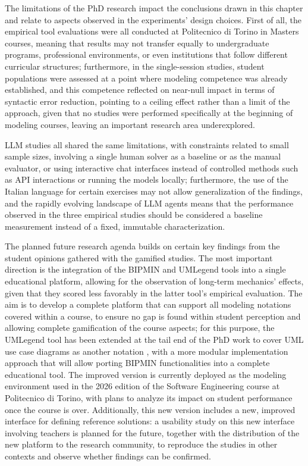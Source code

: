 The limitations of the PhD research impact the conclusions drawn in this chapter and relate to aspects observed in the experiments' design choices. First of all, the empirical tool evaluations were all conducted at Politecnico di Torino in Masters courses, meaning that results may not transfer equally to undergraduate programs, professional environments, or even institutions that follow different curricular structures; furthermore, in the single-session studies, student populations were assessed at a point where modeling competence was already established, and this competence reflected on near-null impact in terms of syntactic error reduction, pointing to a ceiling effect rather than a limit of the approach, given that no studies were performed specifically at the beginning of modeling courses, leaving an important research area underexplored. 

LLM studies all shared the same limitations, with constraints related to small sample sizes, involving a single human solver as a baseline or as the manual evaluator, or using interactive chat interfaces instead of controlled methods such as API interactions or running the models locally; furthermore, the use of the Italian language for certain exercises may not allow generalization of the findings, and the rapidly evolving landscape of LLM agents means that the performance observed in the three empirical studies should be considered a baseline measurement instead of a fixed, immutable characterization.

The planned future research agenda builds on certain key findings from the student opinions gathered with the gamified studies. The most important direction is the integration of the BIPMIN and UMLegend tools into a single educational platform, allowing for the observation of long-term mechanics' effects, given that they scored less favorably in the latter tool's empirical evaluation. The aim is to develop a complete platform that can support all modeling notations covered within a course, to ensure no gap is found within student perception and allowing complete gamification of the course aspects; for this purpose, the UMLegend tool has been extended at the tail end of the PhD work to cover UML use case diagrams as another notation \cite{garaccione2026enhancinggamifiedtooluml}, with a more modular implementation approach that will allow porting BIPMIN functionalities into a complete educational tool. The improved version is currently deployed as the modeling environment used in the 2026 edition of the Software Engineering course at Politecnico di Torino, with plans to analyze its impact on student performance once the course is over. Additionally, this new version includes a new, improved interface for defining reference solutions: a usability study on this new interface involving teachers is planned for the future, together with the distribution of the new platform to the research community, to reproduce the studies in other contexts and observe whether findings can be confirmed.

